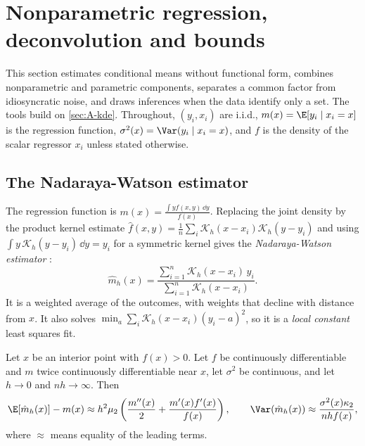 \section{Nonparametric regression, deconvolution and bounds}\label{sec:A-npreg}

This section estimates conditional means without functional form, combines nonparametric and
parametric components, separates a common factor from idiosyncratic noise, and draws inferences when
the data identify only a set. The tools build on \cref{sec:A-kde}. Throughout, $(y_i,x_i)$ are i.i.d.,
$m(x)=\E[y_i\mid x_i=x]$ is the regression function, $\sigma^2(x)=\Var(y_i\mid x_i=x)$, and $f$ is the
density of the scalar regressor $x_i$ unless stated otherwise.

\subsection{The Nadaraya-Watson estimator}\label{sec:A-nw}

The regression function is $m(x)=\frac{\int yf(x,y)\,\dd y}{f(x)}$. Replacing the joint density by the
product kernel estimate $\hat f(x,y)=\frac{1}{n}\sum_i\mathcal{K}_h(x-x_i)\mathcal{K}_h(y-y_i)$ and using
$\int y\,\mathcal{K}_h(y-y_i)\,\dd y=y_i$ for a symmetric kernel gives the \emph{Nadaraya-Watson
estimator} \citep{Nadaraya1964,Watson1964}:
\begin{equation}\label{eq:A-nw}
\hat m_h(x)=\frac{\sum_{i=1}^{n}\mathcal{K}_h(x-x_i)\,y_i}{\sum_{i=1}^{n}\mathcal{K}_h(x-x_i)} .
\end{equation}
It is a weighted average of the outcomes, with weights that decline with distance from $x$. It also
solves $\min_a\sum_i\mathcal{K}_h(x-x_i)(y_i-a)^2$, so it is a \emph{local constant} least squares fit.

\begin{proposition}\label{prop:A-nw}
Let $x$ be an interior point with $f(x)>0$. Let $f$ be continuously differentiable and $m$ twice
continuously differentiable near $x$, let $\sigma^2$ be continuous, and let $h\to0$ and $nh\to\infty$.
Then
\begin{equation}\label{eq:A-nw-bias-var}
\E[\hat m_h(x)]-m(x)\approx h^2\mu_2\left(\frac{m''(x)}{2}+\frac{m'(x)f'(x)}{f(x)}\right),\qquad
\Var(\hat m_h(x))\approx\frac{\sigma^2(x)\kappa_2}{nhf(x)},
\end{equation}
where $\approx$ means equality of the leading terms.
\end{proposition}

